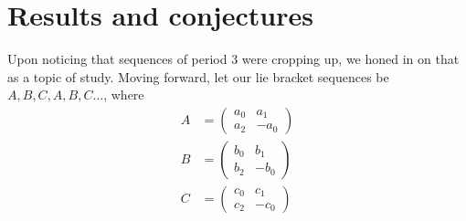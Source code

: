 \documentclass[12pt, letterpaper]{article}
\theoremstyle{definition}
\begin{document}
\section{Results and conjectures}
Upon noticing that sequences of period 3 were cropping up, we honed in on that as a topic of study. Moving forward, let our lie bracket sequences be $A,B,C,A,B,C\dots$, where
\begin{align*}
A &= \begin{pmatrix}
a_0 & a_1 \\
a_2 & -a_0
\end{pmatrix}\\
B &= \begin{pmatrix} b_0 & b_1 \\ b_2 &  -b_0 \end{pmatrix}\\
C &=\begin{pmatrix} c_0 & c_1 \\ c_2 & -c_0 \end{pmatrix}
\end{align*}
\end{document}
